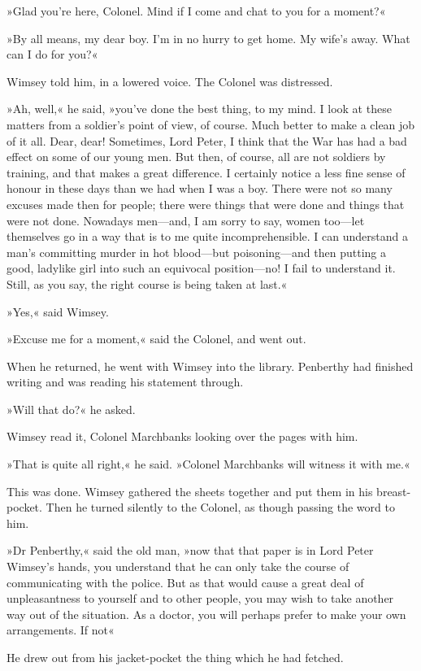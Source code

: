 »Glad you're here, Colonel. Mind if I come and chat to you for a moment?«

»By all means, my dear boy. I'm in no hurry to get home. My wife's away. What can I do for you?«

Wimsey told him, in a lowered voice. The Colonel was distressed.

»Ah, well,« he said, »you've done the best thing, to my mind. I look at these matters from a soldier's point of view, of course. Much better to make a clean job of it all. Dear, dear! Sometimes, Lord Peter, I think that the War has had a bad effect on some of our young men. But then, of course, all are not soldiers by training, and that makes a great difference. I certainly notice a less fine sense of honour in these days than we had when I was a boy. There were not so many excuses made then for people; there were things that were done and things that were not done. Nowadays men—and, I am sorry to say, women too—let themselves go in a way that is to me quite incomprehensible. I can understand a man's committing murder in hot blood—but poisoning—and then putting a good, ladylike girl into such an equivocal position—no! I fail to understand it. Still, as you say, the right course is being taken at last.«

»Yes,« said Wimsey.

»Excuse me for a moment,« said the Colonel, and went out.

When he returned, he went with Wimsey into the library. Penberthy had finished writing and was reading his statement through.

»Will that do?« he asked.

Wimsey read it, Colonel Marchbanks looking over the pages with him.

»That is quite all right,« he said. »Colonel Marchbanks will witness it with me.«

This was done. Wimsey gathered the sheets together and put them in his breast-pocket. Then he turned silently to the Colonel, as though passing the word to him.

»Dr Penberthy,« said the old man, »now that that paper is in Lord Peter Wimsey's hands, you understand that he can only take the course of communicating with the police. But as that would cause a great deal of unpleasantness to yourself and to other people, you may wish to take another way out of the situation. As a doctor, you will perhaps prefer to make your own arrangements. If not\longdash«

He drew out from his jacket-pocket the thing which he had fetched.

